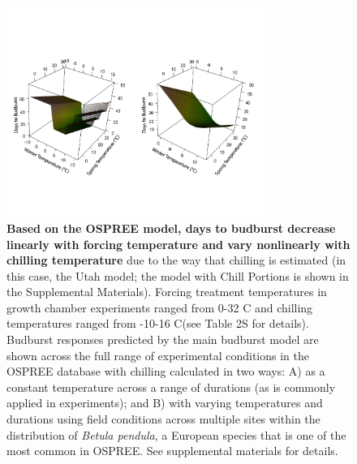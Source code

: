 \documentclass{article}
\begin{document}
\newpage
\begin{figure}[h!]
\centering
\noindent \includegraphics[width=0.75\textwidth]{..//..//analyses/bb_analysis/figures/bbmod_3dplot_utah_withPEP.png}
\caption{\textbf{Based on the OSPREE model, days to budburst decrease linearly with forcing temperature and vary nonlinearly with chilling temperature} due to the way that chilling is estimated (in this case, the Utah model; the model with Chill Portions is shown in the Supplemental Materials). Forcing treatment temperatures in growth chamber experiments ranged from 0-32 \degree C and chilling temperatures ranged from -10-16 \degree C(see Table 2S for details). Budburst responses predicted by the main budburst model are shown across the full range of experimental conditions in the OSPREE database with chilling calculated in two ways: A) as a constant temperature across a range of durations (as  is commonly applied in experiments); and B) with varying temperatures and durations using field conditions across multiple sites within the distribution of \emph{Betula pendula}, a European species that is one of the most common in OSPREE. See supplemental materials for details.}
\label{fig:apc}
\end{figure}
\newpage
\end{document}

